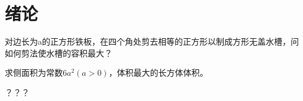 \section{绪论}

\begin{example}
    对边长为a的正方形铁板，在四个角处剪去相等的正方形以制成方形无盖水槽，问如何剪法使水槽的容积最大？
\end{example}

\begin{example}
    求侧面积为常数$6a^2(a>0)$，体积最大的长方体体积。
\end{example}

\begin{problem}
    ？？？
\end{problem}
